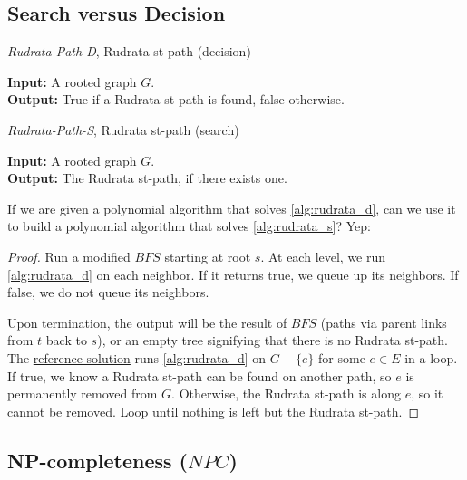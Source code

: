 \documentclass{article}
\theoremstyle{definition}
\begin{document}
\subsection{Search versus Decision}
\begin{algorithm}[H]
	\caption{\textit{Rudrata-Path-D}, Rudrata st-path (decision)}
	\label{alg:rudrata_d}
	\hspace*{\algorithmicindent} \textbf{Input:} A rooted graph $G$.\\
	\hspace*{\algorithmicindent} \textbf{Output:} True if a Rudrata st-path is found, false otherwise.
\end{algorithm}
\begin{algorithm}
	\caption{\textit{Rudrata-Path-S}, Rudrata st-path (search)}
	\label{alg:rudrata_s}
	\hspace*{\algorithmicindent} \textbf{Input:} A rooted graph $G$.\\
	\hspace*{\algorithmicindent} \textbf{Output:} The Rudrata st-path, if there exists one.
\end{algorithm}

If we are given a polynomial algorithm that solves \ref{alg:rudrata_d}, can we use it to build a polynomial algorithm that solves \ref{alg:rudrata_s}? Yep:

\begin{proof}
	Run a modified \hyperref[alg:bfs]{$BFS$} starting at root $s$. At each level, we run \ref{alg:rudrata_d} on each neighbor. If it returns true, we queue up its neighbors. If false, we do not queue its neighbors.
	
	Upon termination, the output will be the result of $BFS$ (paths via parent links from $t$ back to $s$), or an empty tree signifying that there is no Rudrata st-path.\\
	
	The \href{https://cseweb.ucsd.edu/classes/sp08/cse101/hw/hw6soln.pdf}{reference solution} runs \ref{alg:rudrata_d} on $G - \{e\}$ for some $e \in E$ in a loop. If true, we know a Rudrata st-path can be found on another path, so $e$ is permanently removed from $G$. Otherwise, the Rudrata st-path is along $e$, so it cannot be removed. Loop until nothing is left but the Rudrata st-path.
\end{proof}

\subsection{NP-completeness ($NPC$)}
\end{document}
